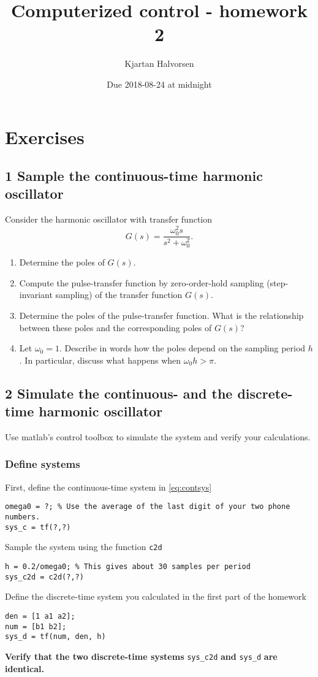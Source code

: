 \documentclass[a4paper]{scrartcl}
\author{Kjartan Halvorsen}
\date{Due 2018-08-24 at midnight}
\title{Computerized control - homework 2}
\begin{document}
\maketitle

\section*{Exercises}
\label{sec-1}

\subsection*{1 Sample the continuous-time harmonic oscillator}
\label{sec-1-1}
Consider the harmonic oscillator with transfer function 
\begin{equation}
G(s) = \frac{\omega_0^2 s}{s^2 + \omega_0^2}.
\label{eq:contsys}
\end{equation}

\begin{enumerate}
\item Determine the poles of \(G(s)\).
\item Compute the pulse-transfer function by zero-order-hold sampling (step-invariant sampling) of the transfer function \(G(s)\).
\item Determine the poles of the pulse-transfer function. What is the relationship between these poles and the corresponding poles of \(G(s)\)?
\item Let $\omega_0=1$. Describe in words how the poles depend on the sampling period $h$. In particular, discuss what happens when $\omega_0h > \pi$.
\end{enumerate}

\subsection*{2 Simulate the continuous- and the discrete-time harmonic oscillator}
\label{sec-1-2}
Use matlab's control toolbox to simulate the system and verify your calculations. 

\subsubsection*{Define systems}
\label{sec-1-2-1}
First, define the continuous-time system in \eqref{eq:contsys}
\begin{verbatim}
omega0 = ?; % Use the average of the last digit of your two phone numbers.
sys_c = tf(?,?)
\end{verbatim}
Sample the system using the function \texttt{c2d}
\begin{verbatim}
h = 0.2/omega0; % This gives about 30 samples per period 
sys_c2d = c2d(?,?)
\end{verbatim}
Define the discrete-time system you calculated in the first part of the homework
\begin{verbatim}
den = [1 a1 a2];
num = [b1 b2];
sys_d = tf(num, den, h)
\end{verbatim}
\textbf{Verify that the two discrete-time systems} \texttt{sys\_c2d} \textbf{and} \texttt{sys\_d} \textbf{are identical.}
\end{document}
